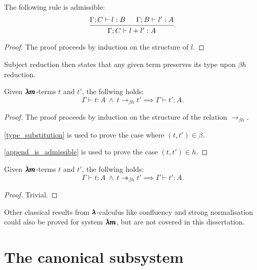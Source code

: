 \begin{lemma}
  \label{append_is_admissible}
  The following rule is admissible:
  \[
    \begin{prooftree}
      \hypo{ \Gamma ; C \vdash l:B }
      \hypo{ \Gamma ; B \vdash l':A }
      \infer2{ \Gamma ; C \vdash  l+l' : A }
    \end{prooftree}.
  \]
\end{lemma}
\begin{proof}
  The proof proceeds by induction on the structure of $l$.
\end{proof}


Subject reduction then states that any given term preserves its type upon $\beta h$ reduction.

\begin{theorem}
  \label{type_preservation}
  Given $\pmb{\lambda m}$-terms $t$ and $t'$, the follwing holds:
  \[
    \Gamma \vdash t : A \ \land \ t \to_{\beta h} t' \implies \Gamma \vdash t' : A.
  \]
\end{theorem}
\begin{proof}
  The proof proceeds by induction on the structure of the relation $\to_{\beta h}$.

  \cref{type_substitution} is used to prove the case where $(t, t') \in \beta$.

  \cref{append_is_admissible} is used to prove the case $(t, t') \in h$.
\end{proof}

\begin{corollary}
  \label{type_preservation2}
  Given $\pmb{\lambda m}$-terms $t$ and $t'$, the follwing holds:
  \[
    \Gamma \vdash t : A \ \land \ t \twoheadrightarrow_{\beta h} t' \implies \Gamma \vdash t' : A.
  \]
\end{corollary}
\begin{proof}
  Trivial.
\end{proof}
  
Other classical results from $\pmb{\lambda}$-calculus like confluency and strong normalisation could also be proved for system $\pmb{\lambda m}$, but are not covered in this dissertation.


\section{The canonical subsystem}

